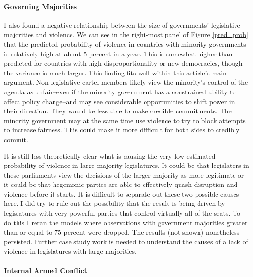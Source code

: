 \documentclass[a4paper]{article}\usepackage[]{graphicx}\usepackage[]{color}
\begin{document}
\paragraph{Governing Majorities}

I also found a negative relationship between the size of governments' legislative majorities and violence. We can see in the right-most panel of Figure \ref{pred_prob} that the predicted probability of violence in countries with minority governments is relatively high at about 5 percent in a year. This is somewhat higher than predicted for countries with high disproportionality or new democracies, though the variance is much larger. This finding fits well within this article's main argument. Non-legislative cartel members likely view the minority's control of the agenda as unfair--even if the minority government has a constrained ability to affect policy change--and may see considerable opportunities to shift power in their direction. They would be less able to make credible commitments. The minority government may at the same time use violence to try to block attempts to increase fairness. This could make it more difficult for both sides to credibly commit.

It is still less theoretically clear what is causing the very low estimated probability of violence in large majority legislatures. It could be that legislators in these parliaments view the decisions of the larger majority as more legitimate or it could be that hegemonic parties are able to effectively quash disruption and violence before it starts. It is difficult to separate out these two possible causes here. I did try to rule out the possibility that the result is being driven by legislatures with very powerful parties that control virtually all of the seats. To do this I reran the models where observations with government majorities greater than or equal to 75 percent were dropped. The results (not shown) nonetheless persisted. Further case study work is needed to understand the causes of a lack of violence in legislatures with large majorities.

\paragraph{Internal Armed Conflict}
\end{document}
